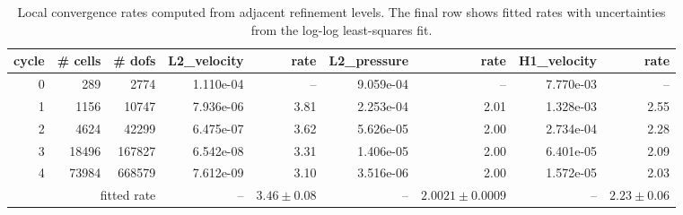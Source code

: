 \begin{table}[htbp]
\centering
\begin{tabular}{|r|r|r|r|r|r|r|r|r|}
\hline
cycle & \# cells & \# dofs & L2\_velocity & rate & L2\_pressure & rate & H1\_velocity & rate \\ \hline
0 & 289 & 2774 & 1.110e-04 & -- & 9.059e-04 & -- & 7.770e-03 & -- \\ \hline
1 & 1156 & 10747 & 7.936e-06 & 3.81 & 2.253e-04 & 2.01 & 1.328e-03 & 2.55 \\ \hline
2 & 4624 & 42299 & 6.475e-07 & 3.62 & 5.626e-05 & 2.00 & 2.734e-04 & 2.28 \\ \hline
3 & 18496 & 167827 & 6.542e-08 & 3.31 & 1.406e-05 & 2.00 & 6.401e-05 & 2.09 \\ \hline
4 & 73984 & 668579 & 7.612e-09 & 3.10 & 3.516e-06 & 2.00 & 1.572e-05 & 2.03 \\ \hline
\multicolumn{3}{|r|}{fitted rate} & -- & $3.46 \pm 0.08$ & -- & $2.0021 \pm 0.0009$ & -- & $2.23 \pm 0.06$ \\ \hline
\end{tabular}
\caption{Local convergence rates computed from adjacent refinement levels. The final row shows fitted rates with uncertainties from the log-log least-squares fit.}
\end{table}
